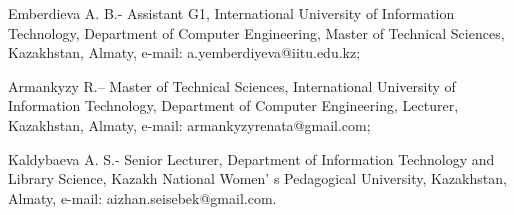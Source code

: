 \begin{authorinfo}
Emberdieva A. B.- Assistant G1, International University of Information
Technology, Department of Computer Engineering, Master of Technical
Sciences, Kazakhstan, Almaty, e-mail:
a.yemberdiyeva@iitu.edu.kz;

Armankyzy R.-- Master of Technical Sciences, International University of
Information Technology, Department of Computer Engineering, Lecturer,
Kazakhstan, Almaty, e-mail:
armankyzyrenata@gmail.com;

Kaldybaeva A. S.- Senior Lecturer, Department of Information Technology
and Library Science, Kazakh National Women' s Pedagogical
University, Kazakhstan, Almaty, e-mail:
aizhan.seisebek@gmail.com.
\end{authorinfo}
